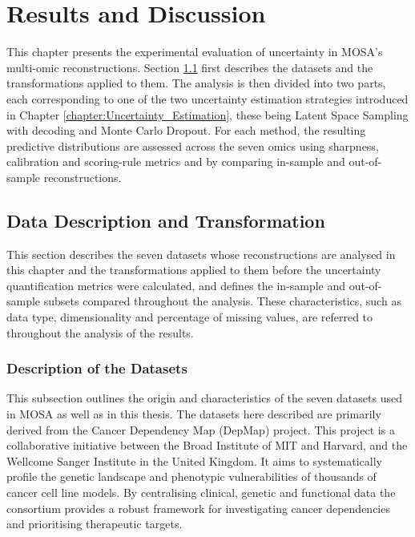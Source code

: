 
\chapter{Results and Discussion}
\label{chapter:evaluation}

This chapter presents the experimental evaluation of uncertainty in \gls{MOSA}'s multi-omic reconstructions. Section \ref{sec:data} first describes the datasets and the transformations applied to them. The analysis is then divided into two parts, each corresponding to one of the two uncertainty estimation strategies introduced in Chapter \ref{chapter:Uncertainty_Estimation}, these being Latent Space Sampling with decoding and Monte Carlo Dropout. For each method, the resulting predictive distributions are assessed across the seven omics using sharpness, calibration and scoring-rule metrics and by comparing in-sample and out-of-sample reconstructions.


\section{Data Description and Transformation} \label{sec:data}

This section describes the seven datasets whose reconstructions are analysed in this chapter and the transformations applied to them before the uncertainty quantification metrics were calculated, and defines the in-sample and out-of-sample subsets compared throughout the analysis. These characteristics, such as data type, dimensionality and percentage of missing values, are referred to throughout the analysis of the results.

\subsection{Description of the Datasets} \label{chapter:Data} \label{chapter:Data_Description}


This subsection outlines the origin and characteristics of the seven datasets used in MOSA as well as in this thesis. The datasets here described are primarily derived from the Cancer Dependency Map (DepMap) project. This project is a collaborative initiative between the Broad Institute of MIT and Harvard, and the Wellcome Sanger Institute in the United Kingdom. It aims to systematically profile the genetic landscape and phenotypic vulnerabilities of thousands of cancer cell line models. By centralising clinical, genetic and functional data the consortium provides a robust framework for investigating cancer dependencies and prioritising therapeutic targets. 


